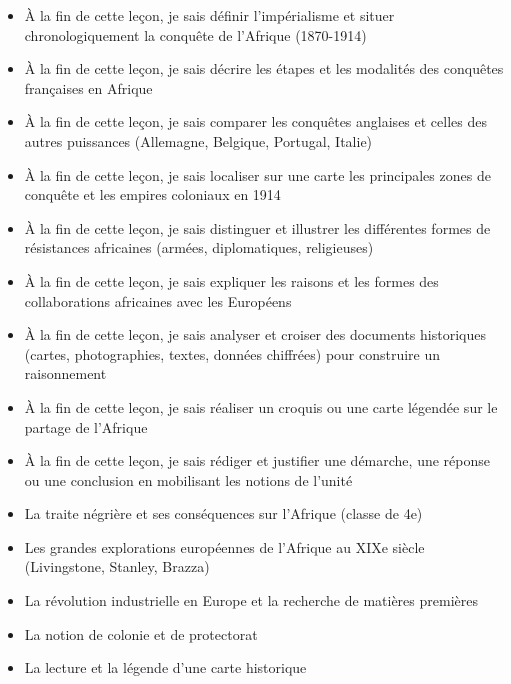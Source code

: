 \documentclass[11pt]{article}
\begin{document}
\begin{objectifs}
\begin{itemize}
\item À la fin de cette leçon, je sais définir l'impérialisme et situer chronologiquement la conquête de l'Afrique (1870-1914)
\item À la fin de cette leçon, je sais décrire les étapes et les modalités des conquêtes françaises en Afrique
\item À la fin de cette leçon, je sais comparer les conquêtes anglaises et celles des autres puissances (Allemagne, Belgique, Portugal, Italie)
\item À la fin de cette leçon, je sais localiser sur une carte les principales zones de conquête et les empires coloniaux en 1914
\item À la fin de cette leçon, je sais distinguer et illustrer les différentes formes de résistances africaines (armées, diplomatiques, religieuses)
\item À la fin de cette leçon, je sais expliquer les raisons et les formes des collaborations africaines avec les Européens
\item À la fin de cette leçon, je sais analyser et croiser des documents historiques (cartes, photographies, textes, données chiffrées) pour construire un raisonnement
\item À la fin de cette leçon, je sais réaliser un croquis ou une carte légendée sur le partage de l'Afrique
\item À la fin de cette leçon, je sais rédiger et justifier une démarche, une réponse ou une conclusion en mobilisant les notions de l'unité
\end{itemize}
\end{objectifs}

\begin{prerequis}
\begin{itemize}
\item La traite négrière et ses conséquences sur l'Afrique (classe de 4e)
\item Les grandes explorations européennes de l'Afrique au XIXe siècle (Livingstone, Stanley, Brazza)
\item La révolution industrielle en Europe et la recherche de matières premières
\item La notion de colonie et de protectorat
\item La lecture et la légende d'une carte historique
\end{itemize}
\end{prerequis}
\end{document}
